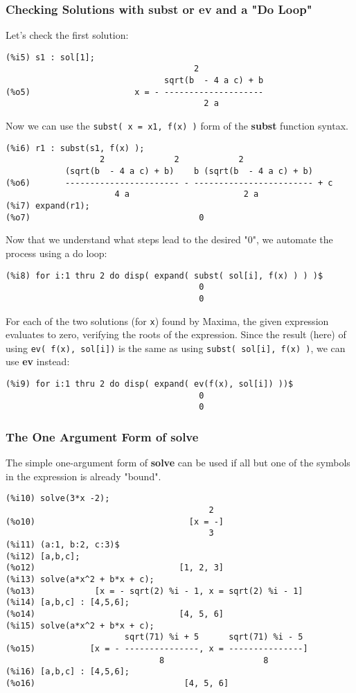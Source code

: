 \documentclass[12pt]{article}
\begin{document}
\subsubsection{Checking Solutions with subst or ev and a "Do Loop"}
Let's check the first solution:
\small
\begin{verbatim}
(%i5) s1 : sol[1];
                                      2
                                sqrt(b  - 4 a c) + b
(%o5)                     x = - --------------------
                                        2 a
\end{verbatim}
\normalsize
Now we can use the \verb|subst( x = x1, f(x) )| form of the \textbf{subst} function syntax.
\small
\begin{verbatim}
(%i6) r1 : subst(s1, f(x) );
                   2              2            2
            (sqrt(b  - 4 a c) + b)    b (sqrt(b  - 4 a c) + b)
(%o6)       ----------------------- - ------------------------ + c
                      4 a                       2 a
(%i7) expand(r1);
(%o7)                                  0
\end{verbatim}
\normalsize
Now that we understand what steps lead to the desired "0", we automate the process
  using a do loop:
\small
\begin{verbatim}
(%i8) for i:1 thru 2 do disp( expand( subst( sol[i], f(x) ) ) )$
                                       0
                                       0
\end{verbatim}
\normalsize
For each of the two solutions (for \verb|x|) found by Maxima, the given expression
  evaluates to zero, verifying the roots of the expression.
\newpage
Since the result (here) of using \verb|ev( f(x), sol[i])| is the same as
  using \verb|subst( sol[i], f(x) )|, we can use \textbf{ev} instead:

\small
\begin{verbatim}
(%i9) for i:1 thru 2 do disp( expand( ev(f(x), sol[i]) ))$
                                       0
                                       0
\end{verbatim}
\normalsize

  
  
\subsubsection{The One Argument Form of solve}  
The simple one-argument form of \textbf{solve} can be used if all but one of the
  symbols in the expression is already "bound".
\small
\begin{verbatim}
(%i10) solve(3*x -2);
                                         2
(%o10)                               [x = -]
                                         3
(%i11) (a:1, b:2, c:3)$
(%i12) [a,b,c];
(%o12)                             [1, 2, 3]
(%i13) solve(a*x^2 + b*x + c);
(%o13)            [x = - sqrt(2) %i - 1, x = sqrt(2) %i - 1]
(%i14) [a,b,c] : [4,5,6];
(%o14)                             [4, 5, 6]
(%i15) solve(a*x^2 + b*x + c);
                        sqrt(71) %i + 5      sqrt(71) %i - 5
(%o15)           [x = - ---------------, x = ---------------]
                               8                    8
(%i16) [a,b,c] : [4,5,6];
(%o16)                              [4, 5, 6]
\end{verbatim}
\normalsize
\end{document}
